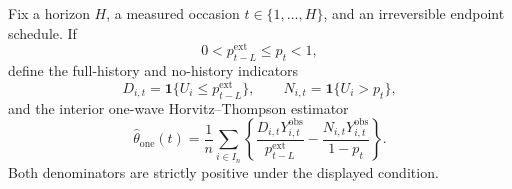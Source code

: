 Fix a horizon \(H\), a measured occasion \(t\in\{1,\ldots,H\}\), and an irreversible endpoint schedule.  If
\[
 0<p^{\mathrm{ext}}_{t-L}\leq p_t<1,
\]
define the full-history and no-history indicators
\[
 D_{i,t}=\mathbf 1\{U_i\leq p^{\mathrm{ext}}_{t-L}\},
 \qquad
 N_{i,t}=\mathbf 1\{U_i>p_t\},
\]
and the interior one-wave Horvitz--Thompson estimator
\[
 \widehat\theta_{\mathrm{one}}(t)
 =\frac1n\sum_{i\in I_n}
 \left\{
 \frac{D_{i,t}Y^{\mathrm{obs}}_{i,t}}{p^{\mathrm{ext}}_{t-L}}
 -\frac{N_{i,t}Y^{\mathrm{obs}}_{i,t}}{1-p_t}
 \right\}.
\]
Both denominators are strictly positive under the displayed condition.